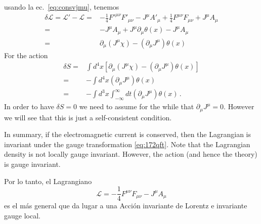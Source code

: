  usando la ec.~\eqref{eq:consvjmu}, tenemos
\begin{align}
  \delta\mathcal{L}=\mathcal{L}'-\mathcal{L}=&
-\frac{1}{4}{F'}^{\mu\nu}F'_{\mu\nu}-J^\mu A'_\mu+\frac{1}{4}F^{\mu\nu}F_{\mu\nu}+J^\mu A_\mu\nonumber\\
=&-J^\mu A_\mu+J^\mu\partial_\mu\theta(x)-J^\mu A_\mu\nonumber\\
=&\partial_\mu(J^\mu\chi)-(\partial_\mu J^\mu)\theta(x)
\end{align}
For the action
\begin{align}
  \delta S=&\int d^4x \left[\partial_\mu(J^\mu\chi)-(\partial_\mu J^\mu)\theta(x)\right]\nonumber\\
=&-\int d^4x (\partial_\mu J^\mu)\theta(x)\nonumber\\
=&-\int d^3x\int_{-\infty}^\infty dt (\partial_\mu J^\mu)\theta(x)\,.
\end{align}
In order to have $\delta S=0$ we need to assume for the while that $\partial_\mu J^\mu=0$. However we will see that this is just a self-consistent condition.

In summary, if the electromagnetic current is conserved, then the Lagrangian is invariant under the gauge transformation \eqref{eq:172qft}. Note that the Lagrangian density is not locally gauge invariant. However, the action (and hence the theory) is gauge invariant.

Por lo tanto, el Lagrangiano
\begin{equation}
  \label{eq:lagAmum}
  \mathcal{L}=-\frac{1}{4}F^{\mu\nu}F_{\mu\nu}-J^\mu A_\mu
\end{equation}
es el más general que da lugar a una Acción invariante de Lorentz e invariante gauge
local. 


